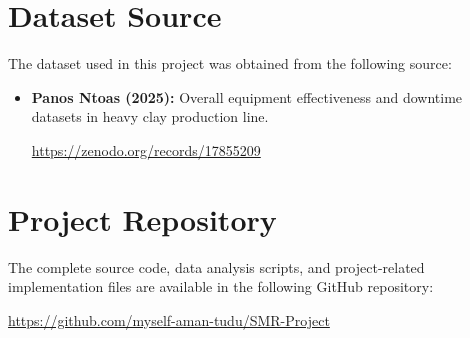 \documentclass[12pt,a4paper,oneside]{article}
\begin{document}

\newpage

\setcounter{section}{1}










\section*{Dataset Source}

The dataset used in this project was obtained from the following source:

\begin{itemize}
    \item \textbf{Panos Ntoas (2025):} 
    Overall equipment effectiveness and downtime datasets in heavy clay production line.

    \url{https://zenodo.org/records/17855209}
\end{itemize}

\section*{Project Repository}

The complete source code, data analysis scripts, and project-related
implementation files are available in the following GitHub repository:

\begin{center}
    \url{https://github.com/myself-aman-tudu/SMR-Project}
\end{center}
\end{document}

